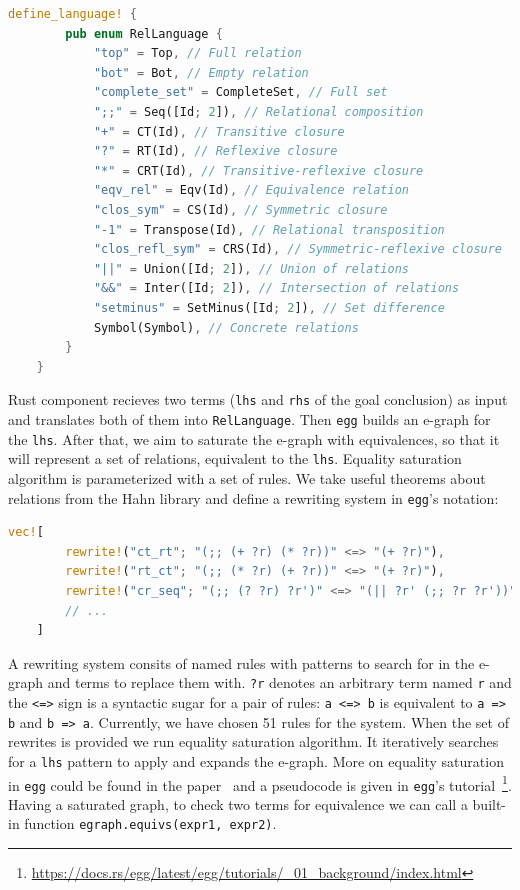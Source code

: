 \vspace{0.5cm}
\begin{lstlisting}[language=rust, style=colouredRust]
    define_language! {
        pub enum RelLanguage {
            "top" = Top, // Full relation
            "bot" = Bot, // Empty relation
            "complete_set" = CompleteSet, // Full set
            ";;" = Seq([Id; 2]), // Relational composition
            "+" = CT(Id), // Transitive closure 
            "?" = RT(Id), // Reflexive closure
            "*" = CRT(Id), // Transitive-reflexive closure
            "eqv_rel" = Eqv(Id), // Equivalence relation 
            "clos_sym" = CS(Id), // Symmetric closure
            "-1" = Transpose(Id), // Relational transposition 
            "clos_refl_sym" = CRS(Id), // Symmetric-reflexive closure
            "||" = Union([Id; 2]), // Union of relations 
            "&&" = Inter([Id; 2]), // Intersection of relations
            "setminus" = SetMinus([Id; 2]), // Set difference
            Symbol(Symbol), // Concrete relations
        }
    }
\end{lstlisting}

Rust component recieves two terms (\texttt{lhs} and \texttt{rhs} of the goal conclusion) as input and translates both of them into \texttt{RelLanguage}. Then \texttt{egg} builds an e-graph for the \texttt{lhs}. After that, we aim to saturate the e-graph with equivalences, so that it will represent a set of relations, equivalent to the \texttt{lhs}. Equality saturation algorithm is parameterized with a set of rules. We take useful theorems about relations from the Hahn library and define a rewriting system in \texttt{egg}'s notation:

\vspace{0.5cm}
\begin{lstlisting}[language=rust, style=colouredRust]
    vec![
        rewrite!("ct_rt"; "(;; (+ ?r) (* ?r))" <=> "(+ ?r)"),
        rewrite!("rt_ct"; "(;; (* ?r) (+ ?r))" <=> "(+ ?r)"),
        rewrite!("cr_seq"; "(;; (? ?r) ?r')" <=> "(|| ?r' (;; ?r ?r'))"),
        // ...
    ]
\end{lstlisting}

A rewriting system consits of named rules with patterns to search for in the e-graph and terms to replace them with. \texttt{?r} denotes an arbitrary term named \texttt{r} and the \texttt{<=>} sign is a syntactic sugar for a pair of rules: \texttt{a <=> b} is equivalent to \texttt{a => b} and \texttt{b => a}. Currently, we have chosen 51 rules for the system. When the set of rewrites is provided we run equality saturation algorithm. It iteratively searches for a \texttt{lhs} pattern to apply and expands the e-graph. More on equality saturation in \texttt{egg} could be found in the paper~\cite{egg} and a pseudocode is given in \texttt{egg}'s tutorial~\footnote{\href{https://docs.rs/egg/latest/egg/tutorials/\_01\_background/index.html}{https://docs.rs/egg/latest/egg/tutorials/\_01\_background/index.html}}. Having a saturated graph, to check two terms for equivalence we can call a built-in function \texttt{egraph.equivs(expr1, expr2)}. 

